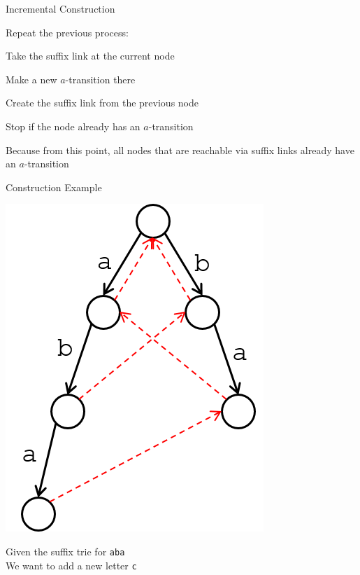 \documentclass[13pt,onlymath]{beamer}
\begin{document}
\begin{frame}{Incremental Construction}
\BIT
\item Repeat the previous process:
\BIT
\item Take the suffix link at the current node
\item Make a new $a$-transition there
\item Create the suffix link from the previous node
\EIT
\item Stop if the node already has an $a$-transition
\BIT
\item Because from this point, all nodes that are reachable via suffix links already have an $a$-transition
\EIT\EIT
\end{frame}

\begin{frame}{Construction Example}
\begin{center}
\includegraphics[height=0.5\textheight]{figures/trie1}

Given the suffix trie for \texttt{aba}\\
We want to add a new letter \texttt{c}
\end{center}
\end{frame}
\end{document}
